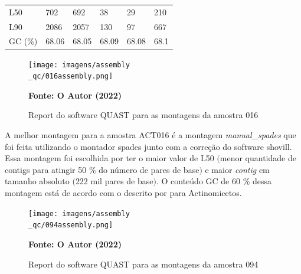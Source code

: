 \begin{table}[htb]
{{\begin{tabular}{llllll}
		L50                                          & 702                                    & 692                                     & 38                                & 29                                    & 210                             \\
		L90                                          & 2086                                   & 2057                                    & 130                               & 97                                    & 667                             \\
		GC (\%)                                      & 68.06                                  & 68.05                                   & 68.09                             & 68.08                                 & 68.1                            \\
	\bottomrule
    \end{tabular}
	}
	}{%
	  }
\end{table}

\begin{figure}[H]
	\caption{Report do software QUAST para as montagens da amostra 016}
	\label{fig:quast_16}
	\centering
		\texttt{[image: imagens/assembly\\\_qc/016assembly.png]} \\
	\centering
    \begin{small}\textbf{Fonte: O Autor (2022)}\end{small}
\end{figure}
\vspace{\floatsep}

A melhor montagem para a amostra ACT016 é a montagem \textit{manual\_spades} que foi feita utilizando
o montador spades junto com a correção do software shovill. Essa montagem foi escolhida por ter o maior
valor de L50 $($menor quantidade de contigs para atingir 50 \% do número de pares de base$)$ e maior 
\textit{contig} em tamanho absoluto $($222 mil pares de base$)$. O conteúdo GC de 60 \% dessa montagem está de acordo
com o descrito por  para Actinomicetos.



\begin{figure}[H]
	\caption{Report do software QUAST para as montagens da amostra 094}
	\label{fig:quast_16}
	\centering
		\texttt{[image: imagens/assembly\\\_qc/094assembly.png]} \\
	\centering
    \begin{small}\textbf{Fonte: O Autor (2022)}\end{small}
\end{figure}
\vspace{\floatsep}

